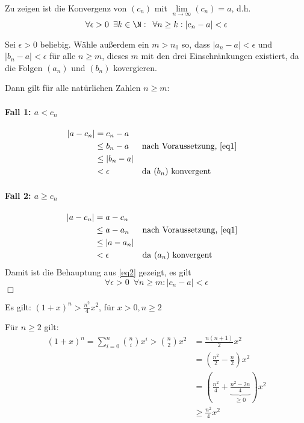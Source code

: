 Zu zeigen ist die Konvergenz von $(c_n)$ mit $\lim\limits_{n\to\infty}(c_n)=a$, d.h.\\
\begin{equation}
	\forall \epsilon>0\enspace\exists k\in\N : \enspace \forall n\geq k: |c_n-a|<\epsilon\label{eq2}
\end{equation}

Sei $\epsilon>0$ beliebig. Wähle außerdem ein $m>n_0$ so, dass $|a_n-a|<\epsilon$ und $|b_n-a|<\epsilon$ für alle $n\geq m$, dieses $m$ mit den drei Einschränkungen existiert, da die Folgen $(a_n)$ und $(b_n)$ kovergieren.

Dann gilt für alle natürlichen Zahlen $n\geq m$:

\paragraph{Fall 1: $a<c_n$} 
\begin{align*}
	|a-c_n|&=c_n-a\\
	&\leq b_n-a && \text{nach Voraussetzung, \autoref{eq1}}\\
	&\leq |b_n-a|\\
	&< \epsilon  && \text{da $(b_n)$ konvergent}
\end{align*}

\paragraph{Fall 2: $a\geq c_n$}
\begin{align*}
	|a-c_n|&=a-c_n\\
	&\leq a-a_n && \text{nach Voraussetzung, \autoref{eq1}}\\
	&\leq |a-a_n|\\
	&< \epsilon  && \text{da $(a_n)$ konvergent}
\end{align*}
Damit ist die Behauptung aus \autoref{eq2} gezeigt, es gilt
\begin{equation}
	\forall \epsilon>0 \enspace \forall n\geq m: |c_n-a|<\epsilon
\end{equation}
 \hfill $\Box$


\begin{lemma}{}\label{lemma:abschaetzung}
	Es gilt: $(1+x)^n>\frac{n^2}{4}x^2$, für $x>0, n\geq 2$
\end{lemma}
\beweis
Für $n\geq2$ gilt:
\begin{align*}
	(1+x)^n=\sum\limits_{i=0}^n\binom{n}{i}x^i>\binom{n}{2}x^2&=\frac{n(n+1)}{2}x^2\\
	&=\left(\frac{n^2}{2}-\frac n2 \right)x^2\\
	&=\left(\frac{n^2}4 + \underbrace{\frac{n^2-2n}{4}}_{\geq 0}\right)x^2\\
	&\geq \frac{n^2}4 x^2
\end{align*}

